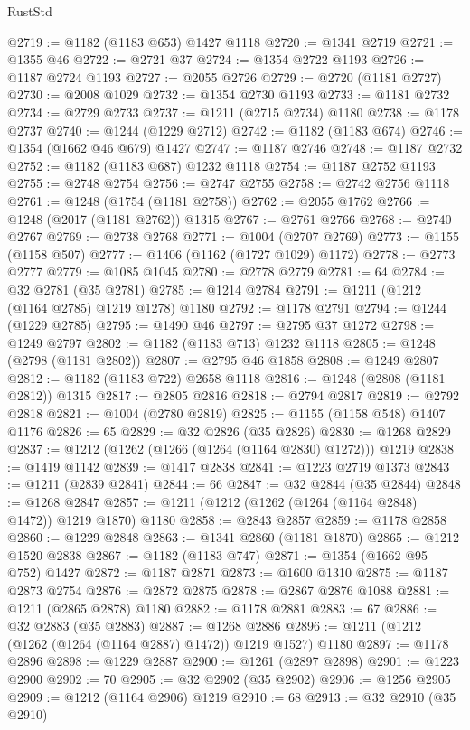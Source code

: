 \begin{lexlean}{RustStd}
\begin{coremodule}
@2719 := @1182 (@1183 @653) @1427 @1118
@2720 := @1341 @2719
@2721 := @1355 @46
@2722 := @2721 @37
@2724 := @1354 @2722 @1193
@2726 := @1187 @2724 @1193
@2727 := @2055 @2726
@2729 := @2720 (@1181 @2727)
@2730 := @2008 @1029
@2732 := @1354 @2730 @1193
@2733 := @1181 @2732
@2734 := @2729 @2733
@2737 := @1211 (@2715 @2734) @1180
@2738 := @1178 @2737
@2740 := @1244 (@1229 @2712)
@2742 := @1182 (@1183 @674)
@2746 := @1354 (@1662 @46 @679) @1427
@2747 := @1187 @2746
@2748 := @1187 @2732
@2752 := @1182 (@1183 @687) @1232 @1118
@2754 := @1187 @2752 @1193
@2755 := @2748 @2754
@2756 := @2747 @2755
@2758 := @2742 @2756 @1118
@2761 := @1248 (@1754 (@1181 @2758))
@2762 := @2055 @1762
@2766 := @1248 (@2017 (@1181 @2762)) @1315
@2767 := @2761 @2766
@2768 := @2740 @2767
@2769 := @2738 @2768
@2771 := @1004 (@2707 @2769)
@2773 := @1155 (@1158 @507)
@2777 := @1406 (@1162 (@1727 @1029) @1172)
@2778 := @2773 @2777
@2779 := @1085 @1045
@2780 := @2778 @2779
@2781 := 64
@2784 := @32 @2781 (@35 @2781)
@2785 := @1214 @2784
@2791 := @1211 (@1212 (@1164 @2785) @1219 @1278) @1180
@2792 := @1178 @2791
@2794 := @1244 (@1229 @2785)
@2795 := @1490 @46
@2797 := @2795 @37 @1272
@2798 := @1249 @2797
@2802 := @1182 (@1183 @713) @1232 @1118
@2805 := @1248 (@2798 (@1181 @2802))
@2807 := @2795 @46 @1858
@2808 := @1249 @2807
@2812 := @1182 (@1183 @722) @2658 @1118
@2816 := @1248 (@2808 (@1181 @2812)) @1315
@2817 := @2805 @2816
@2818 := @2794 @2817
@2819 := @2792 @2818
@2821 := @1004 (@2780 @2819)
@2825 := @1155 (@1158 @548) @1407 @1176
@2826 := 65
@2829 := @32 @2826 (@35 @2826)
@2830 := @1268 @2829
@2837 := @1212 (@1262 (@1266 (@1264 (@1164 @2830) @1272))) @1219
@2838 := @1419 @1142
@2839 := @1417 @2838
@2841 := @1223 @2719 @1373
@2843 := @1211 (@2839 @2841)
@2844 := 66
@2847 := @32 @2844 (@35 @2844)
@2848 := @1268 @2847
@2857 := @1211 (@1212 (@1262 (@1264 (@1164 @2848) @1472)) @1219 @1870) @1180
@2858 := @2843 @2857
@2859 := @1178 @2858
@2860 := @1229 @2848
@2863 := @1341 @2860 (@1181 @1870)
@2865 := @1212 @1520 @2838
@2867 := @1182 (@1183 @747)
@2871 := @1354 (@1662 @95 @752) @1427
@2872 := @1187 @2871
@2873 := @1600 @1310
@2875 := @1187 @2873 @2754
@2876 := @2872 @2875
@2878 := @2867 @2876 @1088
@2881 := @1211 (@2865 @2878) @1180
@2882 := @1178 @2881
@2883 := 67
@2886 := @32 @2883 (@35 @2883)
@2887 := @1268 @2886
@2896 := @1211 (@1212 (@1262 (@1264 (@1164 @2887) @1472)) @1219 @1527) @1180
@2897 := @1178 @2896
@2898 := @1229 @2887
@2900 := @1261 (@2897 @2898)
@2901 := @1223 @2900
@2902 := 70
@2905 := @32 @2902 (@35 @2902)
@2906 := @1256 @2905
@2909 := @1212 (@1164 @2906) @1219
@2910 := 68
@2913 := @32 @2910 (@35 @2910)

\end{coremodule}
\end{lexlean}
